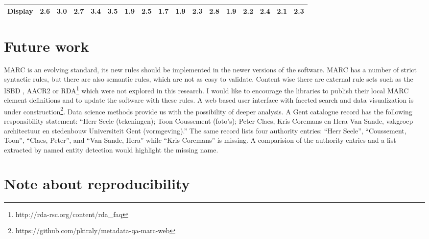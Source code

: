 {\begin{landscape}
\begin{table}
\begin{minipage}{\columnwidth}
\begin{center}
\begin{tabular}{lrrrrrrrrrrrrrrrr}
Display & 2.6 & 3.0 & 2.7 & 3.4 & 3.5 & 1.9 & 2.5 & 1.7 & 1.9 & 2.3 & 2.8 & 1.9 & 2.2 & 2.4 & 2.1 & 2.3 \\
\bottomrule
\end{tabular}
\end{center}
\end{minipage}
\end{table}
    \end{landscape}
    \clearpage%
}



\section{Future work}

MARC is an evolving standard, its new rules should be implemented in the newer versions of the software. MARC has a number of strict syntactic rules, but there are also semantic rules, which are not as easy to validate. Content wise there are external rule sets such as the ISBD \cite{isbd}, AACR2 \cite{aacr2} or RDA\footnote{http://rda-rsc.org/content/rda\_faq} which were not explored in this research. I would like to encourage the libraries to publish their local MARC element definitions and to update the software with these rules. A web based user interface with faceted search and data visualization is under construction\footnote{https://github.com/pkiraly/metadata-qa-marc-web}. Data science methods provide us with the possibility of deeper analysis. A Gent catalogue record has the following responsibility statement: ``Herr Seele (tekeningen); Toon Coussement (foto's); Peter Claes, Kris Coremans en Hera Van Sande, vakgroep architectuur en stedenbouw Universiteit Gent (vormgeving).'' The same record lists four authority entries: ``Herr Seele'', ``Coussement, Toon'', ``Claes, Peter'', and ``Van Sande, Hera'' while ``Kris Coremans'' is missing. A comparision of the authority entries and a list extracted by named entity detection would highlight the missing name.

\section{Note about reproducibility}

